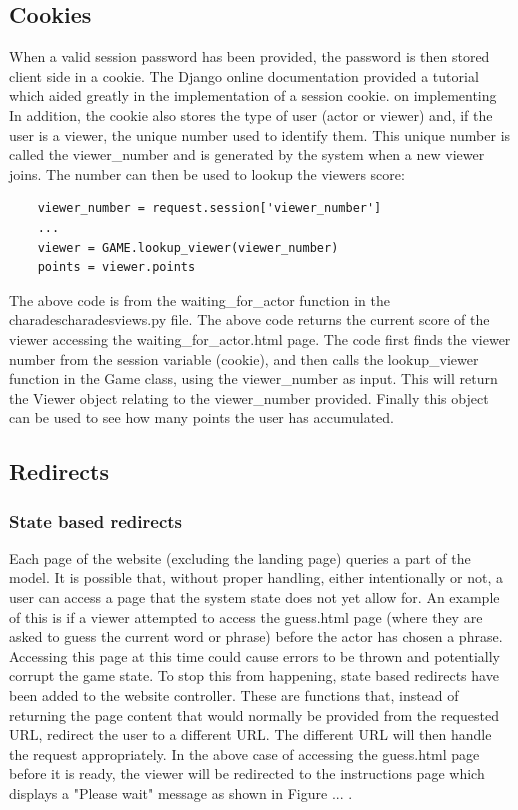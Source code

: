 \subsection{Cookies}
When a valid session password has been provided, the password is then stored client side in a cookie. The Django online documentation \cite{django_cookies} provided a tutorial which aided greatly in the implementation of a session cookie. on implementing  In addition, the cookie also stores the type of user (actor or viewer) and, if the user is a viewer, the unique number used to identify them. This unique number is called the viewer\_number and is generated by the system when a new viewer joins. The number can then be used to lookup the viewers score:

\begin{verbatim}
	viewer_number = request.session['viewer_number']
	...
	viewer = GAME.lookup_viewer(viewer_number)
	points = viewer.points
\end{verbatim}

The above code is from the waiting\_for\_actor function in the \/charades\/charades\/views.py file. The above code returns the current score of the viewer accessing the waiting\_for\_actor.html page. The code first finds the viewer number from the session variable (cookie), and then calls the lookup\_viewer function in the Game class, using the viewer\_number as input. This will return the Viewer object relating to the viewer\_number provided. Finally this object can be used to see how many points the user has accumulated.

\subsection{Redirects}
\subsubsection{State based redirects}
Each page of the website (excluding the landing page) queries a part of the model. It is possible that, without proper handling, either intentionally or not, a user can access a page that the system state does not yet allow for. An example of this is if a viewer attempted to access the guess.html page (where they are asked to guess the current word or phrase) before the actor has chosen a phrase. Accessing this page at this time could cause errors to be thrown and potentially corrupt the game state. To stop this from happening, state based redirects have been added to the website controller. These are functions that, instead of returning the page content that would normally be provided from the requested URL, redirect the user to a different URL. The different URL will then handle the request appropriately. In the above case of accessing the guess.html page before it is ready, the viewer will be redirected to the instructions page which displays a "Please wait" message as shown in Figure ... .

